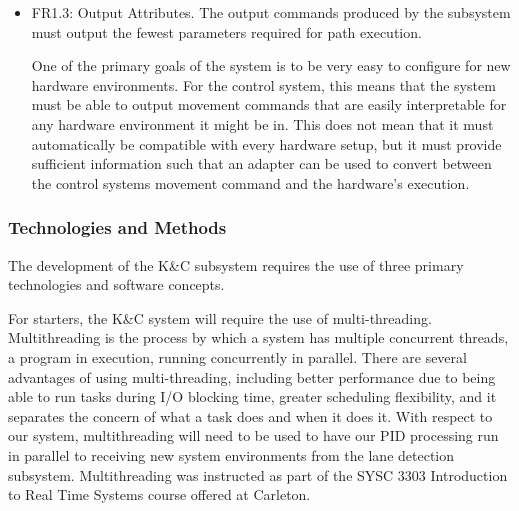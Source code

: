 \documentclass[titlepage,draft]{article}
\begin{document}
{\begin{itemize}
	      However, one potential issue with a purely closed loop system is due to a timing concern. The rate at which lane data is received from the detection module may not be able to keep up with the rate of the desired control frequency defined in FR2.2. This means that there may be times which the system is required to produce an output without having received information about its position within the system, which represents an open control loop.

	      Therefore, it is important for our system to use closed loop properties as frequently possible, and only rely on open loop properties when the latest data is not available.

	\item FR1.3: Output Attributes. The output commands produced by the subsystem must output the fewest parameters required for path execution.

	      One of the primary goals of the system is to be very easy to configure for new hardware environments. For the control system, this means that the system must be able to output movement commands that are easily interpretable for any hardware environment it might be in. This does not mean that it must automatically be compatible with every hardware setup, but it must provide sufficient information such that an adapter can be used to convert between the control systems movement command and the hardware's execution.
\end{itemize}


\subsubsection{Technologies and Methods}
The development of the K\&C subsystem requires the use of three primary technologies and software concepts.

For starters, the K\&C system will require the use of multi-threading. Multithreading is the process by which a system has multiple concurrent threads, a program in execution, running concurrently in parallel. There are several advantages of using multi-threading, including better performance due to being able to run tasks during I/O blocking time, greater scheduling flexibility, and it separates the concern of what a task does and when it does it. With respect to our system, multithreading will need to be used to have our PID processing run in parallel to receiving new system environments from the lane detection subsystem. Multithreading was instructed as part of the SYSC 3303 Introduction to Real Time Systems course offered at Carleton.

}
\end{document}
